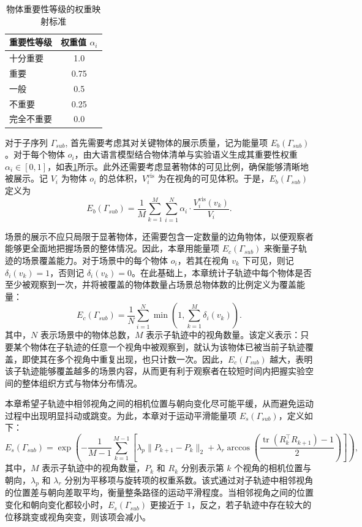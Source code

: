 \begin{table}[htp]
  \centering
  \caption{物体重要性等级的权重映射标准}
  \label{tab:weight_mapping}
  \begin{tabular}{lc}
    \toprule
    重要性等级 & 权重值 $\alpha_i$\\
    \midrule
    十分重要 & 1.0 \\
    重要 & 0.75 \\
    一般 & 0.5 \\
    不重要 & 0.25 \\
    完全不重要 & 0.0 \\
    \bottomrule
  \end{tabular}
\end{table}
对于子序列 $\Gamma_{sub}$, 首先需要考虑其对关键物体的展示质量，记为能量项 $E_b(\Gamma_{sub})$。对于每个物体 $o_i$，由大语言模型结合物体清单与实验语义生成其重要性权重 $\alpha_i \in [0,1]$，如表\ref{tab:weight_mapping}所示。此外还需要考虑显著物体的可见比例，确保能够清晰地被展示。记 $V_i$ 为物体 $o_i$ 的总体积，$V_i^{\mathrm{vis}}$ 为在视角的可见体积。于是，$E_b(\Gamma_{sub})$ 定义为
\begin{equation}
E_b(\Gamma_{sub})
=
\frac{1}{M}
\sum_{k=1}^{M}
\sum_{i=1}^{N}
\alpha_i \cdot \frac{V_i^{\mathrm{vis}}(v_{k})}{V_i}.
\end{equation}

场景的展示不应只局限于显著物体，还需要包含一定数量的边角物体，以便观察者能够更全面地把握场景的整体情况。因此，本章用能量项 $E_c(\Gamma_{sub})$ 来衡量子轨迹的场景覆盖能力。对于场景中的每个物体 $o_i$，若其在视角 $v_{k}$ 下可见，则记 $\delta_i(v_{k})=1$，否则记 $\delta_i(v_{k})=0$。在此基础上，本章统计子轨迹中每个物体是否至少被观察到一次，并将被覆盖的物体数量占场景总物体数的比例定义为覆盖能量：
\begin{equation}
E_c(\Gamma_{sub})
=
\frac{1}{N}
\sum_{i=1}^{N}
\min\left(1,\sum_{k=1}^{M}\delta_i(v_{k})\right).
\end{equation}
其中，$N$ 表示场景中的物体总数，$M$ 表示子轨迹中的视角数量。该定义表示：只要某个物体在子轨迹的任意一个视角中被观察到，就认为该物体已被当前子轨迹覆盖，即使其在多个视角中重复出现，也只计数一次。因此，$E_c(\Gamma_{sub})$ 越大，表明该子轨迹能够覆盖越多的场景内容，从而更有利于观察者在较短时间内把握实验空间的整体组织方式与物体分布情况。


本章希望子轨迹中相邻视角之间的相机位置与朝向变化尽可能平缓，从而避免运动过程中出现明显抖动或跳变。为此，本章对于运动平滑能量项 $E_s(\Gamma_{sub})$，定义如下：
\begin{equation}
E_s(\Gamma_{sub})
=
\exp\left(
-\frac{1}{M-1}
\sum_{k=1}^{M-1}
\left[
\lambda_p \|P_{{k+1}}-P_{k}\|_2
+
\lambda_r \arccos\left(
\frac{\operatorname{tr}(R_{k}^{\top}R_{{k+1}})-1}{2}
\right)
\right]
\right),
\end{equation}
其中，$M$ 表示子轨迹中的视角数量，$P_{k}$ 和 $R_{k}$ 分别表示第 $k$ 个视角的相机位置与朝向，$\lambda_p$ 和 $\lambda_r$ 分别为平移项与旋转项的权重系数。该式通过对子轨迹中相邻视角的位置差与朝向差取平均，衡量整条路径的运动平滑程度。当相邻视角之间的位置变化和朝向变化都较小时，$E_s(\Gamma_{sub})$ 更接近于 $1$，反之，若子轨迹中存在较大的位移跳变或视角突变，则该项会减小。

